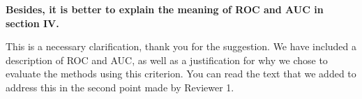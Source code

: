\documentclass[usenames,dvipsnames]{article}
\newcommand{\todo}[1]{\textcolor{red}{#1}}
\begin{document}
\begin{enumerate}
\begin{item}
\textbf{
Besides, it is better to explain the meaning of ROC and AUC in section IV.}

This is a necessary clarification, thank you for the suggestion. We have included a description of ROC and AUC, as well as a justification for why we chose to evaluate the methods using this criterion. You can read the text that we added to address this in the second point made by Reviewer 1.

\end{item}
\end{enumerate}





\end{document}
